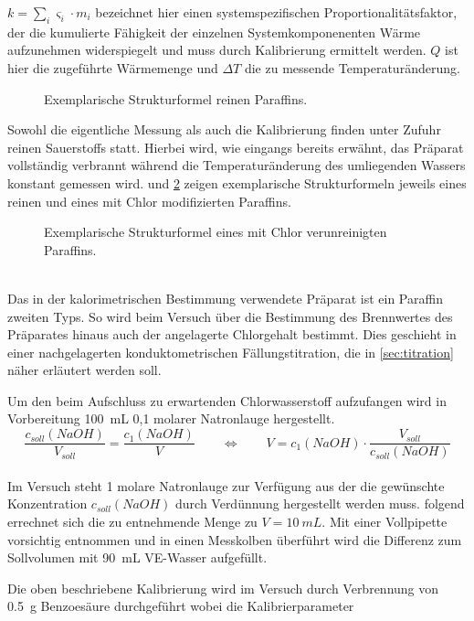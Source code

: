 		\(k = \sum_i \varsigma_i \cdot m_i\) bezeichnet hier einen systemspezifischen Proportionalitätsfaktor, der die kumulierte Fähigkeit der einzelnen Systemkomponenenten Wärme aufzunehmen
		widerspiegelt und muss durch Kalibrierung ermittelt werden. \(Q\) ist hier die zugeführte Wärmemenge und \(\Delta T\) die zu messende Temperaturänderung.\par\medskip
		\begin{figure}[h]
			\centering
			
			\caption[Exemplarische Strukturformel reinen Paraffins]{Exemplarische Strukturformel reinen Paraffins.}
			\label{fig:paraffin rein}
		\end{figure}
		Sowohl die eigentliche Messung als auch die Kalibrierung finden unter Zufuhr reinen Sauerstoffs statt. Hierbei wird, wie eingangs bereits erwähnt, das Präparat
		vollständig verbrannt während die Temperaturänderung des umliegenden Wassers konstant gemessen wird.
		 und \ref{fig:paraffin ckw} zeigen exemplarische Strukturformeln jeweils eines reinen und eines mit Chlor modifizierten
		Paraffins.
		\begin{figure}[h]
			\centering
			
			\caption[Exemplarische Strukturformel eines mit Chlor verunreinigten Paraffins]{Exemplarische Strukturformel eines mit Chlor verunreinigten Paraffins.}
			\label{fig:paraffin ckw}
		\end{figure}\\
		Das in der kalorimetrischen Bestimmung verwendete Präparat ist ein Paraffin zweiten Typs. So wird beim Versuch über die Bestimmung des Brennwertes des
		Präparates hinaus auch der angelagerte Chlorgehalt bestimmt. Dies geschieht in einer nachgelagerten konduktometrischen Fällungstitration, die in \cref{sec:titration}
		näher erläutert werden soll.\par\medskip
		Um den beim Aufschluss zu erwartenden Chlorwasserstoff aufzufangen wird in Vorbereitung \SI{100}{mL} 0,1 molarer Natronlauge hergestellt.
		\begin{equation}
			\frac{c_{soll}(NaOH)}{V_{soll}} = \frac{c_1(NaOH)}{V} \qquad \Leftrightarrow \qquad V = c_1(NaOH) \cdot \frac{V_{soll}}{c_{soll}(NaOH)}
			\label{eq:verduennung}
		\end{equation}\\
		Im Versuch steht 1 molare Natronlauge zur Verfügung aus der die gewünschte Konzentration \(c_{soll}(NaOH)\) durch Verdünnung hergestellt werden muss. 
		folgend errechnet sich die zu entnehmende Menge zu \(V = \SI{10}{mL}\). Mit einer Vollpipette vorsichtig entnommen und in einen Messkolben überführt wird die Differenz
		zum Sollvolumen mit \SI{90}{mL} VE-Wasser aufgefüllt.\par\medskip
		Die oben beschriebene Kalibrierung wird im Versuch durch Verbrennung von \SI{0,5}{g} Benzoesäure durchgeführt wobei die Kalibrierparameter

